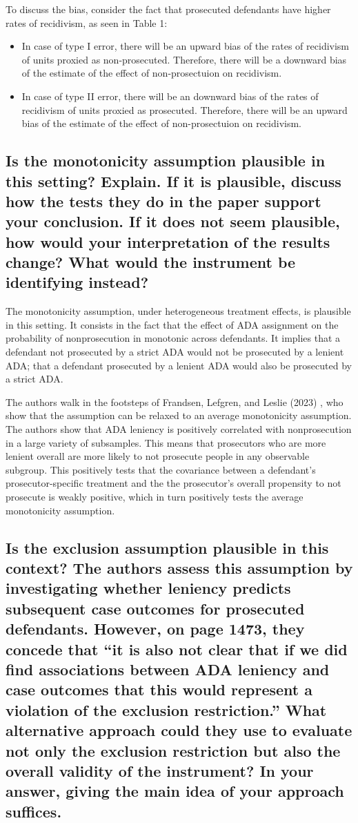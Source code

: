 \documentclass{article}
\begin{document}
To discuss the bias, consider the fact that prosecuted defendants have higher rates of recidivism, as seen in Table 1:
\begin{itemize}
    \item In case of type I error, there will be an upward bias of the rates of recidivism of units proxied as non-prosecuted. Therefore, there will be a downward bias of the estimate of the effect of non-prosectuion on recidivism.
    \item 
    In case of type II error, there will be an downward bias of the rates of recidivism of units proxied as prosecuted. Therefore, there will be an upward bias of the estimate of the effect of non-prosectuion on recidivism.
\end{itemize}

\subsection{Is the monotonicity assumption plausible in this setting? Explain. If it is plausible, discuss how the tests they do in the paper support your conclusion. If it does not seem plausible, how would your interpretation of the results change? What would the instrument be identifying instead?}

The monotonicity assumption, under heterogeneous treatment effects, is plausible in this setting. It consists in the fact that the effect of ADA assignment on the probability of nonprosecution in monotonic across defendants. It implies that a defendant not prosecuted by a strict ADA would not be prosecuted by a lenient ADA; that a defendant prosecuted by a lenient ADA would also be prosecuted by a strict ADA.

The authors walk in the footsteps of Frandsen, Lefgren, and Leslie (2023) \cite{frandsen2023}, who show that the assumption can be relaxed to an average monotonicity assumption. The authors show that ADA leniency is positively correlated with nonprosecution in a large variety of subsamples. This means that prosecutors who are more lenient overall are more likely to not prosecute people in any observable subgroup. This positively tests that the covariance between a defendant's prosecutor-specific treatment and the the prosecutor's overall propensity to not prosecute is weakly positive, which in turn positively tests the average monotonicity assumption.

\subsection{Is the exclusion assumption plausible in this context? The authors assess this assumption by investigating whether leniency predicts subsequent case outcomes for prosecuted defendants. However, on page 1473, they concede that “it is also not clear that if we did find associations between ADA leniency and case outcomes that this would represent a violation of the exclusion restriction.” What alternative approach could they use to evaluate not only the exclusion restriction but also the overall validity of the instrument? In your answer, giving the main idea of your approach suffices.}
\end{document}
